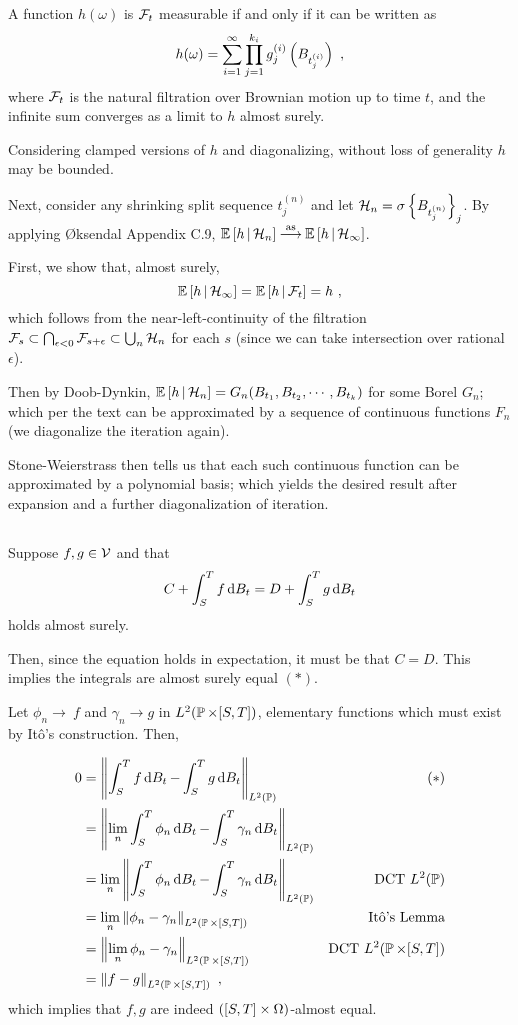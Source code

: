 \documentclass{article}
\begin{document}
        A function \(h(\omega)\) is \(\mcF_t\) measurable if and only if it can be written as
        \[
h(\omega)=\sum_{i=1}^\infty \prod_{j=1}^{k_i}g^{(i)}_j\pa{B_{t_j^{(i)}}}\,\,,
\]
where \(\mcF_t\) is the natural filtration over Brownian motion up to time \(t\), and the infinite sum converges as a limit to \(h\) almost surely.

Considering clamped versions of \(h\) and diagonalizing, without loss of generality \(h\) may be bounded.

Next, consider any shrinking split sequence \(t_j^{(n)}\) and let \(\mcH_n=\sigma\ca{B_{t_j^{(n)}}}_j\). By applying {\O}ksendal Appendix C.9, \(\CE{h}{\mcH_n}\convas \CE{h}{\mcH_\infty}\).

First, we show that, almost surely,
\[
  \CE{h}{\mcH_\infty}=\CE{h}{\mcF_t}=h\,\,,
\]
which follows from the near-left-continuity of the filtration \(\mcF_s\subset\bigcap_{\epsilon<0}\mcF_{s+\epsilon}\subset\bigcup_n\mcH_n\) for each \(s\) (since we can take intersection over rational \(\epsilon\)).

Then by Doob-Dynkin, \(\CE{h}{\mcH_n}=G_n(B_{t_1},B_{t_2},\cdots, B_{t_k})\) for some Borel \(G_n\); which per the text can be approximated by a sequence of continuous functions \(F_n\) (we diagonalize the iteration again).

Stone-Weierstrass then tells us that each such continuous function can be approximated by a polynomial basis; which yields the desired result after expansion and a further diagonalization of iteration.

        \subsection{}

        Suppose \(f,g\in\mcV\) and that
        \[
          C+\int_S^Tf\d{B_t}=D+\int_S^Tg\d{B_t}
        \]
        holds almost surely.

        Then, since the equation holds in expectation, it must be that \(C=D\). This implies the integrals are almost surely equal \((*)\).

        Let \(\phi_n\rightarrow\ f\) and \(\gamma_n\rightarrow g\) in \(L^2(\P\times[S,T])\), elementary functions which must exist by It\^{o}'s construction. Then,

        \begin{align*}
          0
          &=\norm{\int_S^Tf\d{B_t}-\int_S^Tg\d{B_t}}_{L^2(\P)}&(*)\\
          &=\norm{\lim_n\int_S^T\phi_n\d{B_t}-\int_S^T\gamma_n\d{B_t}}_{L^2(\P)}&\\
          &=\lim_n\norm{\int_S^T\phi_n\d{B_t}-\int_S^T\gamma_n\d{B_t}}_{L^2(\P)}&\text{DCT }L^2(\P)\\
          &=\lim_n\norm{\phi_n-\gamma_n}_{L^2(\P\times[S,T])}&\text{It\^{o}'s Lemma}\\
          &=\norm{\lim_n\phi_n-\gamma_n}_{L^2(\P\times[S,T])}&\text{DCT }L^2(\P\times[S,T])\\
          &=\norm{f-g}_{L^2(\P\times[S,T])}\,\,,
        \end{align*}
        which implies that \(f,g\) are indeed \(\pa{[S,T]\times\Omega}\)-almost equal.
\end{document}

